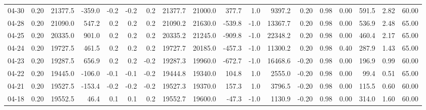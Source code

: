 \begin{threeparttable}
{\begin{tabular}{lrrrrrrrrrrrrrrrrr}
  04-30 &     0.20 & 21377.5 &            -359.0 &              -0.2 &               -0.2 &                0.2 & 21377.7 & 21000.0 &      377.7 &                      1.0 &              9397.2 &       0.20 &      0.98 &           0.00 &            591.5 &            2.82 &                  60.00 \\
  04-28 &     0.20 & 21090.0 &             547.2 &               0.2 &                0.2 &                0.2 & 21090.2 & 21630.0 &     -539.8 &                     -1.0 &             13367.7 &       0.20 &      0.98 &           0.00 &            536.9 &            2.48 &                  65.00 \\
  04-25 &     0.20 & 20335.0 &             901.0 &               0.2 &                0.2 &                0.2 & 20335.2 & 21245.0 &     -909.8 &                     -1.0 &             22348.2 &       0.20 &      0.98 &           0.00 &            460.4 &            2.17 &                  65.00 \\
  04-24 &     0.20 & 19727.5 &             461.5 &               0.2 &                0.2 &                0.2 & 19727.7 & 20185.0 &     -457.3 &                     -1.0 &             11300.2 &       0.20 &      0.98 &           0.40 &            287.9 &            1.43 &                  65.00 \\
  04-23 &     0.20 & 19287.5 &             656.9 &               0.2 &                0.2 &               -0.2 & 19287.3 & 19960.0 &     -672.7 &                     -1.0 &             16468.6 &      -0.20 &      0.98 &           0.00 &            196.9 &            0.99 &                  60.00 \\
  04-22 &     0.20 & 19445.0 &            -106.0 &              -0.1 &               -0.1 &               -0.2 & 19444.8 & 19340.0 &      104.8 &                      1.0 &              2555.0 &      -0.20 &      0.98 &           0.00 &             99.4 &            0.51 &                  65.00 \\
  04-21 &     0.20 & 19527.5 &            -153.4 &              -0.2 &               -0.2 &               -0.2 & 19527.3 & 19370.0 &      157.3 &                      1.0 &              3796.5 &      -0.20 &      0.98 &           0.00 &            115.5 &            0.60 &                  60.00 \\
  04-18 &     0.20 & 19552.5 &              46.4 &               0.1 &                0.1 &                0.2 & 19552.7 & 19600.0 &      -47.3 &                     -1.0 &              1130.9 &      -0.20 &      0.98 &           0.00 &            314.0 &            1.60 &                  60.00 \\

\end{tabular}}
\end{threeparttable}
